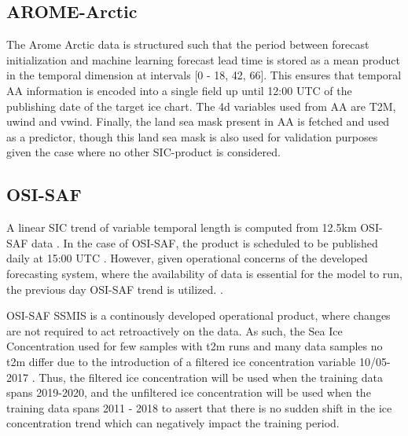 \documentclass[../main/thesis.tex]{subfiles}
\begin{document}
\subsection{AROME-Arctic}
The Arome Arctic data is structured such that the period between forecast initialization and machine learning forecast lead time is stored as a mean product in the temporal dimension at intervals [0 - 18, 42, 66]. This ensures that temporal AA information is encoded into a single field up until 12:00 UTC of the publishing date of the target ice chart. The 4d variables used from AA are T2M, uwind and vwind. Finally, the land sea mask present in AA is fetched and used as a predictor, though this land sea mask is also used for validation purposes given the case where no other SIC-product is considered.

\subsection{OSI-SAF}
A linear SIC trend of variable temporal length is computed from 12.5km OSI-SAF data . In the case of OSI-SAF, the product is scheduled to be published daily at 15:00 UTC . However, given operational concerns of the developed forecasting system, where the availability of data is essential for the model to run, the previous day OSI-SAF trend is utilized. .

OSI-SAF SSMIS is a continously developed operational product, where changes are not required to act retroactively on the data. As such, the Sea Ice Concentration used for few samples with t2m runs and many data samples no t2m differ due to the introduction of a filtered ice concentration variable 10/05-2017 \cite{Tonboe2017}. Thus, the filtered ice concentration will be used when the training data spans 2019-2020, and the unfiltered ice concentration will be used when the training data spans 2011 - 2018 to assert that there is no sudden shift in the ice concentration trend which can negatively impact the training period.



\biblio
\end{document}
